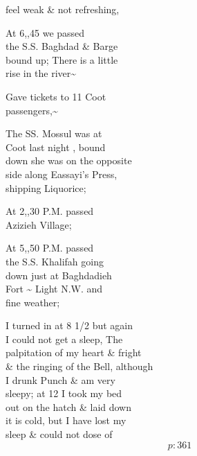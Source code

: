 \documentclass{report}
\begin{document}
	\par{
 	feel weak \& not refreshing,\ \\
	}

	\par{
 	At 6,,45 we passed\ \\the S.S. Baghdad \& Barge\ \\bound up; There is a little\ \\rise in the river\~{}\ \\
	}

	\par{
 	Gave tickets to 11 Coot\ \\passengers,\~{}\ \\
	}

	\par{
 	The SS. Mossul was at\ \\Coot last night , bound\ \\down she was on the opposite\ \\side along Eassayi's Press,\ \\shipping Liquorice;\ \\
	}

	\par{
 	At 2,,30 P.M. passed\ \\Azizieh Village;\ \\
	}

	\par{
 	At 5,,50 P.M. passed\ \\the S.S. Khalifah going\ \\down just at Baghdadieh\ \\Fort \~{} Light N.W. and\ \\fine weather;\ \\
	}

	\par{
 	I turned in at 8 1/2 but again\ \\I could not get a sleep, The\ \\palpitation of my heart \& fright\ \\\& the ringing of the Bell, although\ \\I drunk Punch \& am very\ \\sleepy; at 12 I took my bed\ \\out on the hatch \& laid down\ \\it is cold, but I have lost my\ \\sleep \& could not dose of\ \\
  \[p: 361 \]

	}
\end{document}
